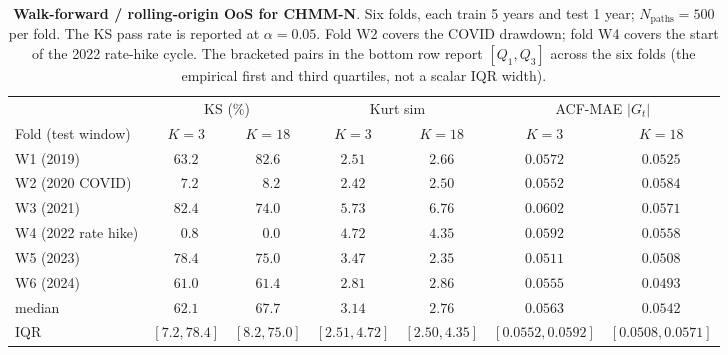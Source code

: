 \begin{table}[!ht]
\centering
\small
\setlength{\tabcolsep}{4pt}
\caption{\textbf{Walk-forward / rolling-origin OoS for CHMM-N}. Six folds, each train 5 years and test 1 year; $N_{\text{paths}} = 500$ per fold. The KS pass rate is reported at $\alpha = 0.05$. Fold W2 covers the COVID drawdown; fold W4 covers the start of the 2022 rate-hike cycle. The bracketed pairs in the bottom row report $[Q_1, Q_3]$ across the six folds (the empirical first and third quartiles, not a scalar IQR width).}
\label{tab:walkforward}
\begin{tabular}{l c c c c c c}
\toprule
& \multicolumn{2}{c}{KS (\%)} & \multicolumn{2}{c}{Kurt sim} & \multicolumn{2}{c}{ACF-MAE $|G_t|$} \\
\cmidrule(lr){2-3} \cmidrule(lr){4-5} \cmidrule(lr){6-7}
Fold (test window) & $K = 3$ & $K = 18$ & $K = 3$ & $K = 18$ & $K = 3$ & $K = 18$ \\
\midrule
W1 (2019)              & $63.2$ & $82.6$ & $2.51$ & $2.66$ & $0.0572$ & $0.0525$ \\
W2 (2020 COVID)        & $\phantom{0}7.2$ & $\phantom{0}8.2$ & $2.42$ & $2.50$ & $0.0552$ & $0.0584$ \\
W3 (2021)              & $82.4$ & $74.0$ & $5.73$ & $6.76$ & $0.0602$ & $0.0571$ \\
W4 (2022 rate hike)    & $\phantom{0}0.8$ & $\phantom{0}0.0$ & $4.72$ & $4.35$ & $0.0592$ & $0.0558$ \\
W5 (2023)              & $78.4$ & $75.0$ & $3.47$ & $2.35$ & $0.0511$ & $0.0508$ \\
W6 (2024)              & $61.0$ & $61.4$ & $2.81$ & $2.86$ & $0.0555$ & $0.0493$ \\
\midrule
median                 & $62.1$ & $67.7$ & $3.14$ & $2.76$ & $0.0563$ & $0.0542$ \\
IQR                    & $[7.2, 78.4]$ & $[8.2, 75.0]$ & $[2.51, 4.72]$ & $[2.50, 4.35]$ & $[0.0552, 0.0592]$ & $[0.0508, 0.0571]$ \\
\bottomrule
\end{tabular}
\end{table}

